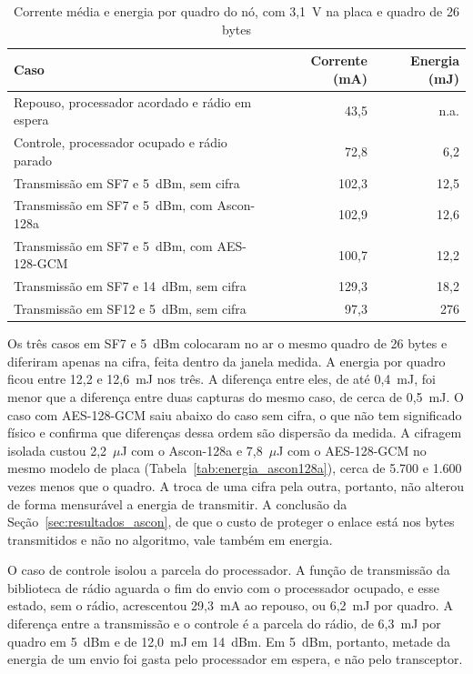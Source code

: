 \begin{table}[htb]
\centering
\caption{Corrente média e energia por quadro do nó, com 3,1~V na placa e quadro de 26 bytes}
\label{tab:energia_no}
\small
\begin{tabular}{lrr}
\hline
\textbf{Caso} & \textbf{Corrente (mA)} & \textbf{Energia (mJ)} \\
\hline
Repouso, processador acordado e rádio em espera & 43,5 & n.a. \\
Controle, processador ocupado e rádio parado & 72,8 & 6,2 \\
Transmissão em SF7 e 5~dBm, sem cifra & 102,3 & 12,5 \\
Transmissão em SF7 e 5~dBm, com Ascon-128a & 102,9 & 12,6 \\
Transmissão em SF7 e 5~dBm, com AES-128-GCM & 100,7 & 12,2 \\
Transmissão em SF7 e 14~dBm, sem cifra & 129,3 & 18,2 \\
Transmissão em SF12 e 5~dBm, sem cifra & 97,3 & 276 \\
\hline
\end{tabular}
\end{table}

Os três casos em SF7 e 5~dBm colocaram no ar o mesmo quadro de 26 bytes e diferiram apenas na cifra, feita dentro da janela medida. A energia por quadro ficou entre 12,2 e 12,6~mJ nos três. A diferença entre eles, de até 0,4~mJ, foi menor que a diferença entre duas capturas do mesmo caso, de cerca de 0,5~mJ. O caso com AES-128-GCM saiu abaixo do caso sem cifra, o que não tem significado físico e confirma que diferenças dessa ordem são dispersão da medida. A cifragem isolada custou 2,2~$\mu$J com o Ascon-128a e 7,8~$\mu$J com o AES-128-GCM no mesmo modelo de placa (Tabela~\ref{tab:energia_ascon128a}), cerca de 5.700 e 1.600 vezes menos que o quadro. A troca de uma cifra pela outra, portanto, não alterou de forma mensurável a energia de transmitir. A conclusão da Seção~\ref{sec:resultados_ascon}, de que o custo de proteger o enlace está nos bytes transmitidos e não no algoritmo, vale também em energia.

O caso de controle isolou a parcela do processador. A função de transmissão da biblioteca de rádio aguarda o fim do envio com o processador ocupado, e esse estado, sem o rádio, acrescentou 29,3~mA ao repouso, ou 6,2~mJ por quadro. A diferença entre a transmissão e o controle é a parcela do rádio, de 6,3~mJ por quadro em 5~dBm e de 12,0~mJ em 14~dBm. Em 5~dBm, portanto, metade da energia de um envio foi gasta pelo processador em espera, e não pelo transceptor.

